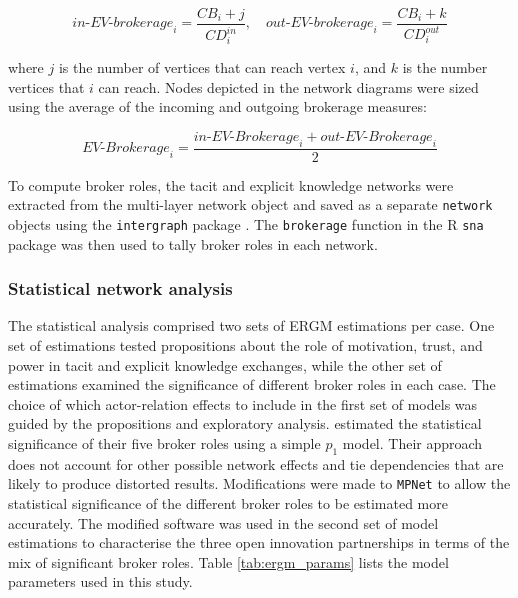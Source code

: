 $$\textit{in-EV-brokerage}_i = \frac{CB_i + j}{CD_i^{in}},  \,\,\,\,\,\, \textit{out-EV-brokerage}_i = \frac{CB_i + k}{CD_i^{out}} $$ \medskip

\noindent where $j$ is the number of vertices that can reach vertex $i$, and $k$ is the number vertices that $i$ can reach. Nodes depicted in the network diagrams were sized using the average of the incoming and outgoing brokerage measures: \medskip

$$ \textit{EV-Brokerage}_i = \frac{\textit{in-EV-Brokerage}_i + \textit{out-EV-Brokerage}_i}{2} $$ \medskip

To compute \citet{gould1989structures} broker roles, the tacit and explicit knowledge networks were extracted from the multi-layer network object and saved as a separate \texttt{network} objects \citep{butts2008network} using the \texttt{intergraph} package \citep{bojanowski2015intergraph}. The \texttt{brokerage} function in the R \texttt{sna} package \citep{butts2016sna} was then used to tally broker roles in each network. 

\subsubsection{Statistical network analysis}

The statistical analysis comprised two sets of ERGM estimations per case. One set of estimations tested propositions about the role of motivation, trust, and power in tacit and explicit knowledge exchanges, while the other set of estimations examined the significance of different broker roles in each case. The choice of which actor\hyp{}relation effects to include in the first set of models was guided by the propositions and exploratory analysis. \citet{gould1989structures} estimated the statistical significance of their five broker roles using a simple $p_1$ model. Their approach does not account for other possible network effects and tie dependencies that are likely to produce distorted results. Modifications were made to \texttt{MPNet} to allow the statistical significance of the different broker roles to be estimated more accurately. The modified software was used in the second set of model estimations to characterise the three open innovation partnerships in terms of the mix of significant broker roles. Table \ref{tab:ergm_params} lists the model parameters used in this study. \medskip

